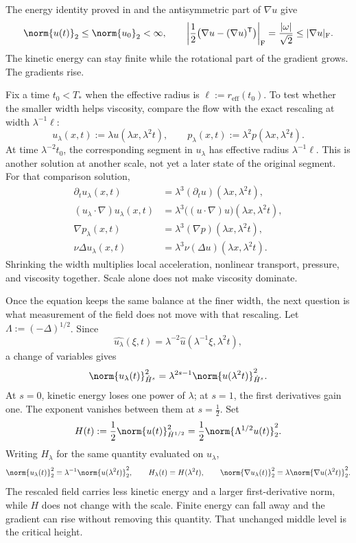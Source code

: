 The energy identity proved in  and the antisymmetric part of \(\nabla u\) give
\[
  \norm{u(t)}_2
  \leq
  \norm{u_0}_2
  <\infty,
  \qquad
  \left|\frac12\bigl(\nabla u-(\nabla u)^{\mathsf T}\bigr)\right|_{\mathrm F}
  =
  \frac{|\omega|}{\sqrt2}
  \leq
  |\nabla u|_{\mathrm F}.
\]
The kinetic energy can stay finite while the rotational part of the gradient grows. The gradients rise.


Fix a time \(t_0<T_*\) when the effective radius is \(\ell:=r_{\mathrm{eff}}(t_0)\). To test whether the smaller width helps viscosity, compare the flow with the exact \NavierStokes{} rescaling at width \(\lambda^{-1}\ell\):
\[
  u_\lambda(x,t)
  :=
  \lambda u(\lambda x,\lambda^2t),
  \qquad
  p_\lambda(x,t)
  :=
  \lambda^2p(\lambda x,\lambda^2t).
\]
At time \(\lambda^{-2}t_0\), the corresponding segment in \(u_\lambda\) has effective radius \(\lambda^{-1}\ell\). This is another solution at another scale, not yet a later state of the original segment. For that comparison solution,
\[
\begin{aligned}
  \partial_tu_\lambda(x,t)
  &=
  \lambda^3(\partial_tu)(\lambda x,\lambda^2t),
  \\
  (u_\lambda\cdot\nabla)u_\lambda(x,t)
  &=
  \lambda^3\bigl((u\cdot\nabla)u\bigr)(\lambda x,\lambda^2t),
  \\
  \nabla p_\lambda(x,t)
  &=
  \lambda^3(\nabla p)(\lambda x,\lambda^2t),
  \\
  \nu\Delta u_\lambda(x,t)
  &=
  \lambda^3\nu(\Delta u)(\lambda x,\lambda^2t).
\end{aligned}
\]
Shrinking the width multiplies local acceleration, nonlinear transport, pressure, and viscosity together. Scale alone does not make viscosity dominate.


Once the equation keeps the same balance at the finer width, the next question is what measurement of the field does not move with that rescaling. Let \(\Lambda:=(-\Delta)^{1/2}\). Since
\[
  \widehat{u_\lambda}(\xi,t)
  =
  \lambda^{-2}\widehat u(\lambda^{-1}\xi,\lambda^2t),
\]
a change of variables gives
\[
  \norm{u_\lambda(t)}_{\dot H^s}^2
  =
  \lambda^{2s-1}
  \norm{u(\lambda^2t)}_{\dot H^s}^2.
\]
At \(s=0\), kinetic energy loses one power of \(\lambda\); at \(s=1\), the first derivatives gain one. The exponent vanishes between them at \(s=\tfrac12\). Set
\[
  H(t)
  :=
  \frac12\norm{u(t)}_{\dot H^{1/2}}^2
  =
  \frac12\norm{\Lambda^{1/2}u(t)}_2^2.
\]
Writing \(H_\lambda\) for the same quantity evaluated on \(u_\lambda\),
\[
  \norm{u_\lambda(t)}_2^2
  =
  \lambda^{-1}\norm{u(\lambda^2t)}_2^2,
  \qquad
  H_\lambda(t)=H(\lambda^2t),
  \qquad
  \norm{\nabla u_\lambda(t)}_2^2
  =
  \lambda\norm{\nabla u(\lambda^2t)}_2^2.
\]
The rescaled field carries less kinetic energy and a larger first-derivative norm, while \(H\) does not change with the scale. Finite energy can fall away and the gradient can rise without removing this quantity. That unchanged middle level is the critical height.

